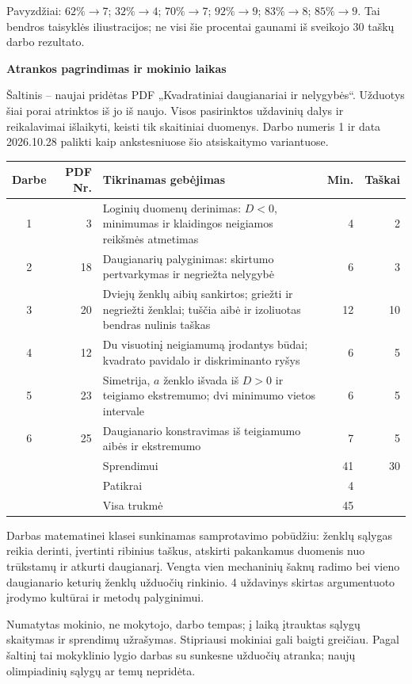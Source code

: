 \documentclass[11pt]{article}
\newcommand{\sk}[1]{\par\medskip\textbf{#1}\par}
\begin{document}
Pavyzdžiai: $62\%\to7$; $32\%\to4$; $70\%\to7$; $92\%\to9$; $83\%\to8$; $85\%\to9$. Tai bendros taisyklės iliustracijos; ne visi šie procentai gaunami iš sveikojo 30 taškų darbo rezultato.
\newpage
\sk{Atrankos pagrindimas ir mokinio laikas}
Šaltinis -- naujai pridėtas PDF „Kvadratiniai daugianariai ir nelygybės“. Užduotys šiai porai atrinktos iš jo iš naujo. Visos pasirinktos uždavinių dalys ir reikalavimai išlaikyti, keisti tik skaitiniai duomenys. Darbo numeris 1 ir data 2026.10.28 palikti kaip ankstesniuose šio atsiskaitymo variantuose.
\begin{center}\renewcommand{\arraystretch}{1.25}
\begin{tabularx}{\linewidth}{@{}crXrr@{}}\toprule
Darbe & PDF Nr. & Tikrinamas gebėjimas & Min. & Taškai\\\midrule
1 & 3 & Loginių duomenų derinimas: $D<0$, minimumas ir klaidingos neigiamos reikšmės atmetimas & 4 & 2\\
2 & 18 & Daugianarių palyginimas: skirtumo pertvarkymas ir negriežta nelygybė & 6 & 3\\
3 & 20 & Dviejų ženklų aibių sankirtos; griežti ir negriežti ženklai; tuščia aibė ir izoliuotas bendras nulinis taškas & 12 & 10\\
4 & 12 & Du visuotinį neigiamumą įrodantys būdai; kvadrato pavidalo ir diskriminanto ryšys & 6 & 5\\
5 & 23 & Simetrija, $a$ ženklo išvada iš $D>0$ ir teigiamo ekstremumo; dvi minimumo vietos intervale & 6 & 5\\
6 & 25 & Daugianario konstravimas iš teigiamumo aibės ir ekstremumo & 7 & 5\\\midrule
 & & Sprendimui & 41 & 30\\
 & & Patikrai & 4 & \\
 & & Visa trukmė & 45 & \\\bottomrule
\end{tabularx}\end{center}
Darbas matematinei klasei sunkinamas samprotavimo pobūdžiu: ženklų sąlygas reikia derinti, įvertinti ribinius taškus, atskirti pakankamus duomenis nuo trūkstamų ir atkurti daugianarį. Vengta vien mechaninių šaknų radimo bei vieno daugianario keturių ženklų užduočių rinkinio. 4 uždavinys skirtas argumentuoto įrodymo kultūrai ir metodų palyginimui.

Numatytas mokinio, ne mokytojo, darbo tempas; į laiką įtrauktas sąlygų skaitymas ir sprendimų užrašymas. Stipriausi mokiniai gali baigti greičiau. Pagal šaltinį tai mokyklinio lygio darbas su sunkesne užduočių atranka; naujų olimpiadinių sąlygų ar temų nepridėta.
\end{document}
